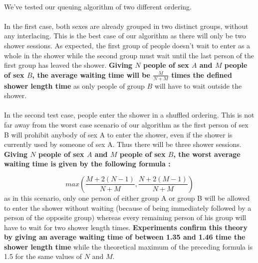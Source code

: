 \documentclass[a4paper]{article}
\begin{document}
    \paragraph{}We've tested our queuing algorithm of two different ordering.

    \paragraph{}In the first case, both sexes are already grouped in two
    distinct groups, without any interlacing. This is the best case of our
    algorithm as there will only be two shower sessions. As expected, the first
    group of people doesn't wait to enter as a whole in the shower while the
    second group must wait until the last person of the first group has leaved
    the shower. \textbf{Giving $N$ people of sex $A$ and $M$ people of sex $B$,
    the average waiting time will be $\frac{M}{N + M}$ times the defined shower
    length time} as only people of group $B$ will have to wait outside the shower.

    \paragraph{}In the second test case, people enter the shower in a shuffled
    ordering. This is not far away from the worst case scenario of our algorithm
    as the first person of sex B will prohibit anybody of sex A to enter the shower,
    even if the shower is currently used by someone of sex A. Thus there will be
    three shower sessions. \textbf{Giving $N$ people of sex $A$ and $M$ people
    of sex $B$, the worst average waiting time is given by the following
    formula :}

    \[
        max\left(\frac{M + 2(N - 1)}{N + M}, \frac{N + 2(M - 1)}{N + M}\right)
    \]
    as in this scenario, only one person of either group A or group B
    will be allowed to enter the shower without waiting (because of being
    immediately followed by a person of the opposite group) whereas every
    remaining person of his group will have to wait for two shower length
    times.\newline
    \textbf{Experiments confirm this theory by giving an average waiting time of
    between 1.35 and 1.46 time the shower length time} while the theoretical
    maximum of the preceding formula is 1.5 for the same values of $N$ and $M$.
\end{document}
